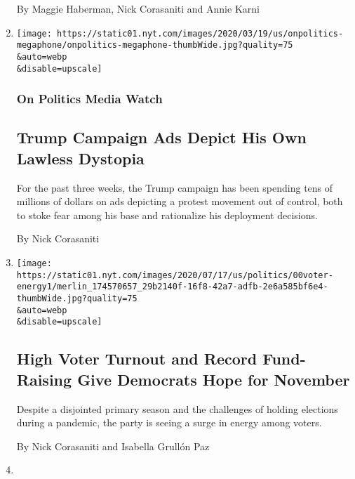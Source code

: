 \begin{enumerate}
  By Maggie Haberman, Nick Corasaniti and Annie Karni
\item
  \href{/2020/07/21/us/politics/trump-campaign-ads.html}{}

  \texttt{[image: https://static01.nyt.com/images/2020/03/19/us/onpolitics-megaphone/onpolitics-megaphone-thumbWide.jpg?quality=75\\\&auto=webp\\\&disable=upscale]}

  \hypertarget{on-politics-media-watch-2}{%
  \subsubsection{On Politics Media
  Watch}\label{on-politics-media-watch-2}}

  \hypertarget{trump-campaign-ads-depict-his-own-lawless-dystopia}{%
  \subsection{Trump Campaign Ads Depict His Own Lawless
  Dystopia}\label{trump-campaign-ads-depict-his-own-lawless-dystopia}}

  For the past three weeks, the Trump campaign has been spending tens of
  millions of dollars on ads depicting a protest movement out of
  control, both to stoke fear among his base and rationalize his
  deployment decisions.

  By Nick Corasaniti
\item
  \href{/2020/07/21/us/politics/biden-2020.html}{}

  \texttt{[image: https://static01.nyt.com/images/2020/07/17/us/politics/00voter-energy1/merlin\_174570657\_29b2140f-16f8-42a7-adfb-2e6a585bf6e4-thumbWide.jpg?quality=75\\\&auto=webp\\\&disable=upscale]}

  \hypertarget{high-voter-turnout-and-record-fund-raising-give-democrats-hope-for-november}{%
  \subsection{High Voter Turnout and Record Fund-Raising Give Democrats
  Hope for
  November}\label{high-voter-turnout-and-record-fund-raising-give-democrats-hope-for-november}}

  Despite a disjointed primary season and the challenges of holding
  elections during a pandemic, the party is seeing a surge in energy
  among voters.

  By Nick Corasaniti and Isabella Grullón Paz
\item
  \href{/2020/07/16/us/politics/twitter-hack.html}{}


\end{enumerate}
